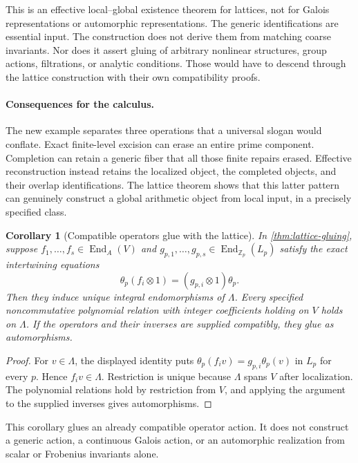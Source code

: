 \documentclass[11pt]{article}
\newtheorem{corollary}[theorem]{Corollary}
\theoremstyle{definition}
\theoremstyle{remark}
\begin{document}
This is an effective local--global existence theorem for lattices, not for Galois representations or automorphic representations. The generic identifications are essential input. The construction does not derive them from matching coarse invariants. Nor does it assert gluing of arbitrary nonlinear structures, group actions, filtrations, or analytic conditions. Those would have to descend through the lattice construction with their own compatibility proofs.

\paragraph{Consequences for the calculus.}
The new example separates three operations that a universal slogan would conflate. Exact finite-level excision can erase an entire prime component. Completion can retain a generic fiber that all those finite repairs erased. Effective reconstruction instead retains the localized object, the completed objects, and their overlap identifications. The lattice theorem shows that this latter pattern can genuinely construct a global arithmetic object from local input, in a precisely specified class.

\begin{corollary}[Compatible operators glue with the lattice]\label{cor:lattice-operators}
In \cref{thm:lattice-gluing}, suppose $f_1,\ldots,f_s\in\operatorname{End}_A(V)$ and $g_{p,1},\ldots,g_{p,s}\in\operatorname{End}_{\mathbb Z_p}(L_p)$ satisfy the exact intertwining equations
\[
 \theta_p(f_i\otimes1)=(g_{p,i}\otimes1)\theta_p.
\]
Then they induce unique integral endomorphisms of $\Lambda$. Every specified noncommutative polynomial relation with integer coefficients holding on $V$ holds on $\Lambda$. If the operators and their inverses are supplied compatibly, they glue as automorphisms.
\end{corollary}
\begin{proof}
For $v\in\Lambda$, the displayed identity puts $\theta_p(f_i v)=g_{p,i}\theta_p(v)$ in $L_p$ for every $p$. Hence $f_i v\in\Lambda$. Restriction is unique because $\Lambda$ spans $V$ after localization. The polynomial relations hold by restriction from $V$, and applying the argument to the supplied inverses gives automorphisms.
\end{proof}

This corollary glues an already compatible operator action. It does not construct a generic action, a continuous Galois action, or an automorphic realization from scalar or Frobenius invariants alone.
\end{document}
